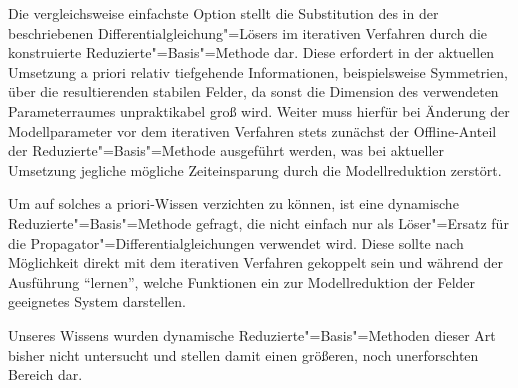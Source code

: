 \documentclass[../main.tex]{subfiles}
\begin{document}
Die vergleichsweise einfachste Option stellt die Substitution des in der  beschriebenen Differentialgleichung"=Lösers im iterativen Verfahren durch die konstruierte Reduzierte"=Basis"=Methode dar.
Diese erfordert in der aktuellen Umsetzung a priori relativ tiefgehende Informationen, beispielsweise Symmetrien, über die resultierenden stabilen Felder, da sonst die Dimension des verwendeten Parameterraumes unpraktikabel groß wird.
Weiter muss hierfür bei Änderung der Modellparameter vor dem iterativen Verfahren stets zunächst der Offline-Anteil der Reduzierte"=Basis"=Methode ausgeführt werden, was bei aktueller Umsetzung jegliche mögliche Zeiteinsparung durch die Modellreduktion zerstört.

Um auf solches a priori-Wissen verzichten zu können, ist eine dynamische Reduzierte"=Basis"=Methode gefragt, die nicht einfach nur als Löser"=Ersatz für die Propagator"=Differentialgleichungen verwendet wird.
Diese sollte nach Möglichkeit direkt mit dem iterativen Verfahren gekoppelt sein und während der Ausführung \enquote{lernen}, welche Funktionen ein zur Modellreduktion der Felder geeignetes System darstellen.

Unseres Wissens wurden dynamische Reduzierte"=Basis"=Methoden dieser Art bisher nicht untersucht und stellen damit einen größeren, noch unerforschten Bereich dar.
\end{document}
